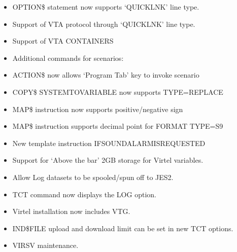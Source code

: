 \documentclass[letterpaper,10pt,english]{sphinxmanual}
\begin{document}
\sphinxAtStartPar
{}
\begin{itemize}
\item {} 
\sphinxAtStartPar
OPTION\$ statement now supports ‘QUICKLNK’ line type.

\item {} 
\sphinxAtStartPar
Support of VTA protocol through ‘QUICKLNK’ line type.

\item {} 
\sphinxAtStartPar
Support of VTA CONTAINERS

\item {} 
\sphinxAtStartPar
Additional commands for scenarios:

\item {} 
\sphinxAtStartPar
ACTION\$ now allows ‘Program Tab’ key to invoke scenario

\item {} 
\sphinxAtStartPar
COPY\$ SYSTEM\sphinxhyphen{}TO\sphinxhyphen{}VARIABLE now supports TYPE=REPLACE

\item {} 
\sphinxAtStartPar
MAP\$ instruction now supports positive/negative sign

\item {} 
\sphinxAtStartPar
MAP\$ instruction supports decimal point for FORMAT TYPE=S9

\item {} 
\sphinxAtStartPar
New template instruction IF\sphinxhyphen{}SOUND\sphinxhyphen{}ALARM\sphinxhyphen{}IS\sphinxhyphen{}REQUESTED

\end{itemize}

\sphinxAtStartPar
{}
\begin{itemize}
\item {} 
\sphinxAtStartPar
Support for ‘Above the bar’ 2GB storage for Virtel variables.

\item {} 
\sphinxAtStartPar
Allow Log datasets to be spooled/spun off to JES2.

\item {} 
\sphinxAtStartPar
TCT command now displays the LOG option.

\item {} 
\sphinxAtStartPar
Virtel installation now includes VTG.

\item {} 
\sphinxAtStartPar
IND\$FILE upload and download limit can be set in new TCT options.

\item {} 
\sphinxAtStartPar
VIRSV maintenance.

\end{itemize}
\end{document}
